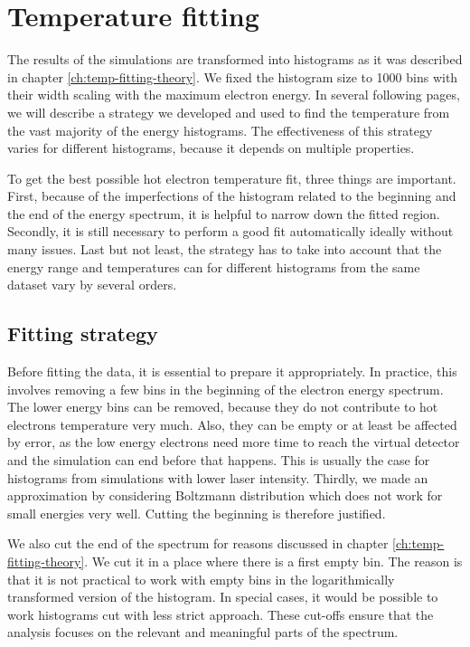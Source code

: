\section{Temperature fitting}
The results of the simulations are transformed into histograms as it was described in chapter \ref{ch:temp-fitting-theory}. We fixed the histogram size to 1000 bins with their width scaling with the maximum electron energy. In several following pages, we will describe a strategy we developed and used to find the temperature from the vast majority of the energy histograms. The effectiveness of this strategy varies for different histograms, because it depends on multiple properties.

To get the best possible hot electron temperature fit, three things are important. First, because of the imperfections of the histogram related to the beginning and the end of the energy spectrum, it is helpful to narrow down the fitted region. Secondly, it is still necessary to perform a good fit automatically ideally without many issues. Last but not least, the strategy has to take into account that the energy range and temperatures can for different histograms from the same dataset vary by several orders.

\subsection*{Fitting strategy}
Before fitting the data, it is essential to prepare it appropriately. In practice, this involves removing a few bins in the beginning of the electron energy spectrum. The lower energy bins can be removed, because they do not contribute to hot electrons temperature very much. Also, they can be empty or at least be affected by error, as the low energy electrons need more time to reach the virtual detector and the simulation can end before that happens. This is usually the case for histograms from simulations with lower laser intensity. Thirdly, we made an approximation by considering Boltzmann distribution which does not work for small energies very well. Cutting the beginning is therefore justified. 

We also cut the end of the spectrum for reasons discussed in chapter \ref{ch:temp-fitting-theory}. We cut it in a place where there is a first empty bin. The reason is that it is not practical to work with empty bins in the logarithmically transformed version of the histogram. In special cases, it would be possible to work histograms cut with less strict approach. These cut-offs ensure that the analysis focuses on the relevant and meaningful parts of the spectrum.


